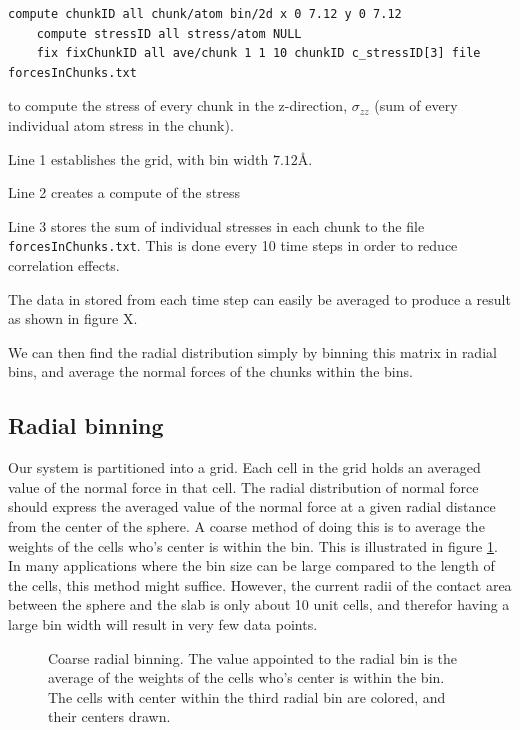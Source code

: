 \documentclass[twoside,english]{uiofysmaster}
\begin{document}
\begin{lstlisting}[language=LammpsInput]
	compute chunkID all chunk/atom bin/2d x 0 7.12 y 0 7.12
	compute stressID all stress/atom NULL
	fix fixChunkID all ave/chunk 1 1 10 chunkID c_stressID[3] file forcesInChunks.txt
\end{lstlisting} 
to compute the stress of every chunk in the z-direction, $\sigma_{zz}$ (sum of every individual atom stress in the chunk). 

Line 1 establishes the grid, with bin width $7.12$Å.

Line 2 creates a compute of the stress

Line 3 stores the sum of individual stresses in each chunk to the file \texttt{forcesInChunks.txt}. 
This is done every 10 time steps in order to reduce correlation effects. 

The data in stored from each time step can easily be averaged to produce a result as shown in figure X.

We can then find the radial distribution simply by binning this matrix in radial bins, and average the normal forces of the chunks within the bins.

\subsection{Radial binning}
Our system is partitioned into a grid. 
Each cell in the grid holds an averaged value of the normal force in that cell. 
The radial distribution of normal force should express the averaged value of the normal force at a given radial distance from the {\color{editColor}center of the sphere}. 
A coarse method of doing this is to average the weights of the cells who's center is within the bin. 
This is illustrated in figure \ref{fig:radialBinningChoars}. 
In many applications where the bin size can be large compared to the length of the cells, this method might suffice.
However, the current radii of the contact area between the sphere and the slab is only about 10 unit cells, and therefor having a large bin width will result in very few data points. 

 \begin{figure}
 	\center
 	\resizebox{0.48\linewidth}{!}{
 		
 	}
 	\caption{Coarse radial binning. The value appointed to the radial bin is the average of the weights of the cells who's center is within the bin. The cells with center within the third radial bin are colored, and their centers drawn.}
 	\label{fig:radialBinningChoars}
 \end{figure}
\end{document}

